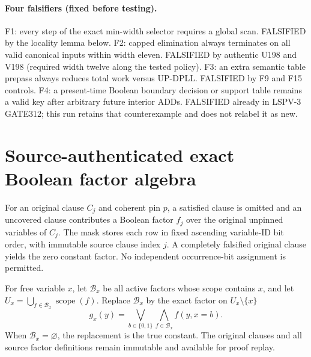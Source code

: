 \documentclass[11pt]{article}
\begin{document}
\paragraph{Four falsifiers (fixed before testing).} F1: every step of the exact min-width selector requires a global scan. FALSIFIED by the locality lemma below. F2: capped elimination always terminates on all valid canonical inputs within width eleven. FALSIFIED by authentic U198 and V198 (required width twelve along the tested policy). F3: an extra semantic table prepass always reduces total work versus UP-DPLL. FALSIFIED by F9 and F15 controls. F4: a present-time Boolean boundary decision or support table remains a valid key after arbitrary future interior ADDs. FALSIFIED already in LSPV-3 GATE312; this run retains that counterexample and does not relabel it as new.

\section{Source-authenticated exact Boolean factor algebra}
For an original clause $C_j$ and coherent pin $p$, a satisfied clause is omitted and an uncovered clause contributes a Boolean factor $f_j$ over the original unpinned variables of $C_j$. The mask stores each row in fixed ascending variable-ID bit order, with immutable source clause index $j$. A completely falsified original clause yields the zero constant factor. No independent occurrence-bit assignment is permitted.

For free variable $x$, let $\mathcal B_x$ be all active factors whose scope contains $x$, and let $U_x=\bigcup_{f\in\mathcal B_x}\operatorname{scope}(f)$. Replace $\mathcal B_x$ by the exact factor on $U_x\setminus\{x\}$
\[
 g_x(y)=\bigvee_{b\in\{0,1\}}\bigwedge_{f\in\mathcal B_x}f(y,x=b).
\]
When $\mathcal B_x=\varnothing$, the replacement is the true constant. The original clauses and all source factor definitions remain immutable and available for proof replay.
\end{document}
